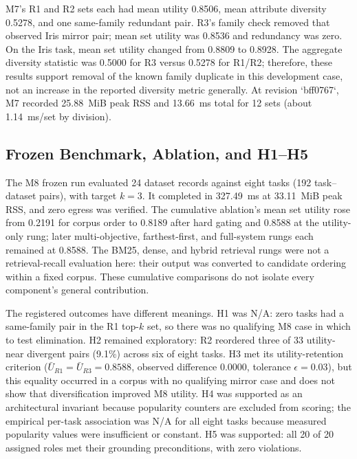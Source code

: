 \documentclass[conference]{IEEEtran}
\begin{document}
M7's R1 and R2 sets each had mean utility 0.8506, mean attribute diversity 0.5278, and one same-family redundant pair. R3's family check removed that observed Iris mirror pair; mean set utility was 0.8536 and redundancy was zero. On the Iris task, mean set utility changed from 0.8809 to 0.8928. The aggregate diversity statistic was 0.5000 for R3 versus 0.5278 for R1/R2; therefore, these results support removal of the known family duplicate in this development case, not an increase in the reported diversity metric generally. At revision `bff0767`, M7 recorded 25.88~MiB peak RSS and 13.66~ms total for 12 sets (about 1.14~ms/set by division).

\subsection{Frozen Benchmark, Ablation, and H1--H5}
The M8 frozen run evaluated 24 dataset records against eight tasks (192 task--dataset pairs), with target $k=3$. It completed in 327.49~ms at 33.11~MiB peak RSS, and zero egress was verified. The cumulative ablation's mean set utility rose from 0.2191 for corpus order to 0.8189 after hard gating and 0.8588 at the utility-only rung; later multi-objective, farthest-first, and full-system rungs each remained at 0.8588. The BM25, dense, and hybrid retrieval rungs were not a retrieval-recall evaluation here: their output was converted to candidate ordering within a fixed corpus. These cumulative comparisons do not isolate every component's general contribution.

The registered outcomes have different meanings. H1 was N/A: zero tasks had a same-family pair in the R1 top-$k$ set, so there was no qualifying M8 case in which to test elimination. H2 remained exploratory: R2 reordered three of 33 utility-near divergent pairs (9.1\%) across six of eight tasks. H3 met its utility-retention criterion ($\bar U_{R1}=\bar U_{R3}=0.8588$, observed difference 0.0000, tolerance $\epsilon=0.03$), but this equality occurred in a corpus with no qualifying mirror case and does not show that diversification improved M8 utility. H4 was supported as an architectural invariant because popularity counters are excluded from scoring; the empirical per-task association was N/A for all eight tasks because measured popularity values were insufficient or constant. H5 was supported: all 20 of 20 assigned roles met their grounding preconditions, with zero violations.
\end{document}
